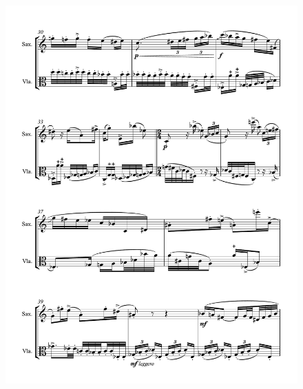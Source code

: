 \begin{figure}[htbp]
    \centering
	\includegraphics[width=6.5in]{figures/Sax_Viola_24.pdf}
\end{figure}


